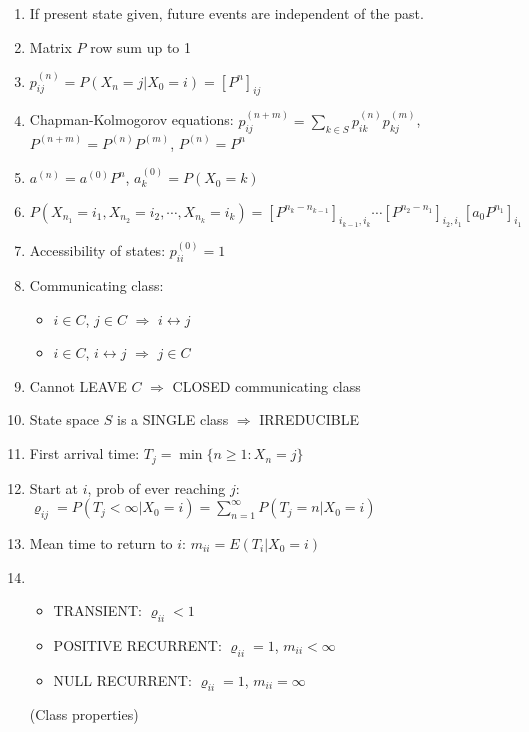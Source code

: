 \documentclass[11pt,a4paper]{article}
\begin{document}
\begin{enumerate}[resume]
\item If present state given, future events are independent of the past. 

\item Matrix $P$ row sum up to 1

\item $p_{ij}^{(n)} = P(X_n = j | X_0 = i) = [P^n]_{ij}$

\item Chapman-Kolmogorov equations: $\displaystyle p_{ij}^{(n+m)} = \sum_{k \in S} p_{ik}^{(n)} p_{kj}^{(m)}$, $P^{(n+m)} = P^{(n)} P^{(m)}$, $P^{(n)} = P^n$

\item $a^{(n)} = a^{(0)} P^n$, $a_k^{(0)} = P(X_0 = k)$

\item $P(X_{n_1} = i_1, X_{n_2} = i_2, \cdots, X_{n_k} = i_k) = [P^{n_k - n_{k-1}}]_{i_{k-1}, i_k} \cdots [P^{n_2 - n_1}]_{i_2, i_1} [a_0 P^{n_1}]_{i_1}$

\item Accessibility of states: $p_{ii}^{(0)} =1$

\item Communicating class: \begin{itemize}
\item $i \in C$, $j \in C$ $\Rightarrow$ $i \leftrightarrow j$
\item $i \in C$, $i \leftrightarrow j$ $\Rightarrow$ $j \in C$
\end{itemize}

\item Cannot LEAVE $C$ $\Rightarrow$ CLOSED communicating class

\item State space $S$ is a SINGLE class $\Rightarrow$ IRREDUCIBLE

\item First arrival time: $T_j = \min \{n \geq 1 : X_n = j\}$

\item Start at $i$, prob of ever reaching $j$: $\varrho_{ij} = P(T_j < \infty | X_0 = i) = \sum_{n=1}^{\infty} P(T_j = n | X_0 = i)$

\item Mean time to return to $i$: $m_{ii} = E(T_i | X_0 = i)$

\item \begin{itemize}
\item TRANSIENT: $\varrho_{ii} < 1$
\item POSITIVE RECURRENT: $\varrho_{ii} = 1$, $m_{ii} < \infty$
\item NULL RECURRENT: $\varrho_{ii} = 1$, $m_{ii} = \infty$
\end{itemize}
(Class properties)


\end{enumerate}
\end{document}
